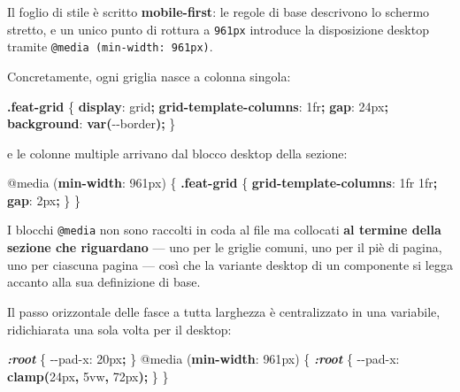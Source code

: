 \documentclass[
  11pt,
]{article}
\newenvironment{Shaded}{\begin{snugshade}}{\end{snugshade}}
\newcommand{\DataTypeTok}[1]{\textcolor[rgb]{0.13,0.29,0.53}{#1}}
\newcommand{\DecValTok}[1]{\textcolor[rgb]{0.00,0.00,0.81}{#1}}
\newcommand{\FunctionTok}[1]{\textcolor[rgb]{0.13,0.29,0.53}{\textbf{#1}}}
\newcommand{\ImportTok}[1]{#1}
\newcommand{\InformationTok}[1]{\textcolor[rgb]{0.56,0.35,0.01}{\textbf{\textit{#1}}}}
\newcommand{\KeywordTok}[1]{\textcolor[rgb]{0.13,0.29,0.53}{\textbf{#1}}}
\newcommand{\NormalTok}[1]{#1}
\newcommand{\OperatorTok}[1]{\textcolor[rgb]{0.81,0.36,0.00}{\textbf{#1}}}
\newcommand{\VariableTok}[1]{\textcolor[rgb]{0.00,0.00,0.00}{#1}}
\begin{document}
Il foglio di stile è scritto \textbf{mobile-first}: le regole di base
descrivono lo schermo stretto, e un unico punto di rottura a
\texttt{961px} introduce la disposizione desktop tramite
\texttt{@media\ (min-width:\ 961px)}.

Concretamente, ogni griglia nasce a colonna singola:

\begin{Shaded}
\begin{Highlighting}[]
\FunctionTok{.feat{-}grid}\NormalTok{ \{}
  \KeywordTok{display}\NormalTok{: }\DecValTok{grid}\OperatorTok{;} \KeywordTok{grid{-}template{-}columns}\NormalTok{: }\DecValTok{1}\DataTypeTok{fr}\OperatorTok{;}
  \KeywordTok{gap}\NormalTok{: }\DecValTok{24}\DataTypeTok{px}\OperatorTok{;} \KeywordTok{background}\NormalTok{: }\FunctionTok{var(}\VariableTok{{-}{-}border}\FunctionTok{)}\OperatorTok{;}
\NormalTok{\}}
\end{Highlighting}
\end{Shaded}

e le colonne multiple arrivano dal blocco desktop della sezione:

\begin{Shaded}
\begin{Highlighting}[]
\ImportTok{@media}\NormalTok{ (}\KeywordTok{min{-}width}\NormalTok{: }\DecValTok{961}\DataTypeTok{px}\NormalTok{) \{}
  \FunctionTok{.feat{-}grid}\NormalTok{ \{ }\KeywordTok{grid{-}template{-}columns}\NormalTok{: }\DecValTok{1}\DataTypeTok{fr} \DecValTok{1}\DataTypeTok{fr}\OperatorTok{;} \KeywordTok{gap}\NormalTok{: }\DecValTok{2}\DataTypeTok{px}\OperatorTok{;}\NormalTok{ \}}
\NormalTok{\}}
\end{Highlighting}
\end{Shaded}

I blocchi \texttt{@media} non sono raccolti in coda al file ma collocati
\textbf{al termine della sezione che riguardano} --- uno per le griglie
comuni, uno per il piè di pagina, uno per ciascuna pagina --- così che
la variante desktop di un componente si legga accanto alla sua
definizione di base.

Il passo orizzontale delle fasce a tutta larghezza è centralizzato in
una variabile, ridichiarata una sola volta per il desktop:

\begin{Shaded}
\begin{Highlighting}[]
\InformationTok{:root}\NormalTok{ \{ }\VariableTok{{-}{-}pad{-}x}\NormalTok{: }\DecValTok{20}\DataTypeTok{px}\OperatorTok{;}\NormalTok{ \}}
\ImportTok{@media}\NormalTok{ (}\KeywordTok{min{-}width}\NormalTok{: }\DecValTok{961}\DataTypeTok{px}\NormalTok{) \{}
  \InformationTok{:root}\NormalTok{ \{ }\VariableTok{{-}{-}pad{-}x}\NormalTok{: }\FunctionTok{clamp(}\DecValTok{24}\DataTypeTok{px}\OperatorTok{,} \DecValTok{5}\DataTypeTok{vw}\OperatorTok{,} \DecValTok{72}\DataTypeTok{px}\FunctionTok{)}\OperatorTok{;}\NormalTok{ \}}
\NormalTok{\}}
\end{Highlighting}
\end{Shaded}
\end{document}
